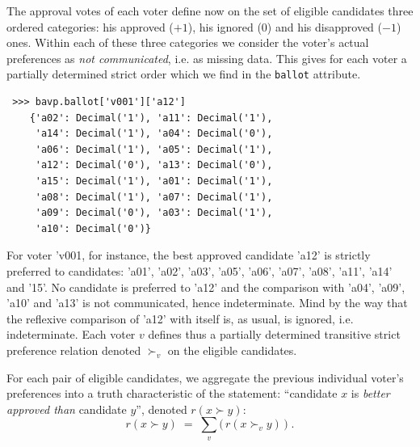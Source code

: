 The approval votes of each voter define now on the set of eligible candidates three ordered categories: his approved ($+1$), his ignored ($0$) and his disapproved ($-1$) ones. Within each of these three categories we consider the voter's actual preferences as \emph{not communicated}, i.e. as missing data. This gives for each voter a partially determined strict order which we find in the \texttt{ballot} attribute.
\begin{lstlisting}
 >>> bavp.ballot['v001']['a12']
    {'a02': Decimal('1'), 'a11': Decimal('1'),
     'a14': Decimal('1'), 'a04': Decimal('0'),
     'a06': Decimal('1'), 'a05': Decimal('1'),
     'a12': Decimal('0'), 'a13': Decimal('0'),
     'a15': Decimal('1'), 'a01': Decimal('1'),
     'a08': Decimal('1'), 'a07': Decimal('1'),
     'a09': Decimal('0'), 'a03': Decimal('1'),
     'a10': Decimal('0')}
\end{lstlisting}
For voter 'v001, for instance, the best approved candidate 'a12' is strictly preferred to candidates: 'a01', 'a02', 'a03', 'a05', 'a06', 'a07', 'a08', 'a11', 'a14' and '15'. No candidate is preferred to 'a12' and the comparison with 'a04', 'a09', 'a10' and 'a13' is not communicated, hence indeterminate. Mind by the way that the reflexive comparison of 'a12' with itself is, as usual, is ignored, i.e. indeterminate. Each voter $v$ defines thus a partially determined transitive strict preference relation denoted $\succ_v$ on the eligible candidates.

For each pair of eligible candidates, we aggregate the previous individual voter's preferences into a truth characteristic of the statement: ``candidate $x$ is \emph{better approved than} candidate $y$'', denoted $r(x \succ y)$:
\begin{equation}
  r(x \succ y)\;=\; \sum_v \big(\,r(x \succ_v y)\, \big)\;.
\end{equation}  

